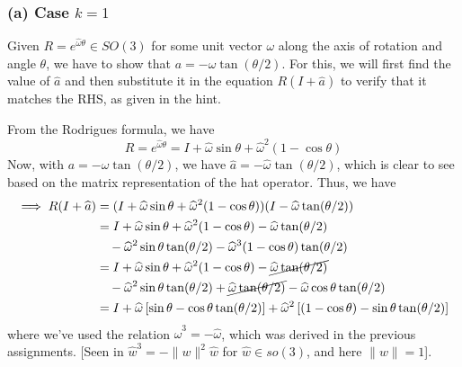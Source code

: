 \clearpage
\subsubsection*{(a) Case \( k=1 \)}

Given \( R = e^{\widehat{\omega} \theta} \in SO(3) \) for some unit vector \( \omega \) along the axis of rotation and angle \( \theta \), we have to show that \( a = -\omega \tan(\theta / 2) \).
For this, we will first find the value of \( \widehat{a} \) and then substitute it in the equation \( R(I + \widehat{a}) \) to verify that it matches the RHS, as given in the hint.

From the Rodrigues formula, we have
\begin{equation*}
    R = e^{\widehat{\omega} \theta} = I + \widehat{\omega} \sin \theta + \widehat{\omega}^{2} (1 - \cos \theta)
\end{equation*}
Now, with \( a = -\omega \tan(\theta / 2) \), we have \( \widehat{a} = -\widehat{\omega} \tan(\theta / 2) \), which is clear to see based on the matrix representation of the hat operator.
Thus, we have
\begin{align*}
    \implies
    R(I + \widehat{a})
     & =
    (I + \widehat{\omega} \sin \theta + \widehat{\omega}^{2} (1 - \cos \theta))(I - \widehat{\omega} \tan(\theta / 2))
    \\ & =
    I + \widehat{\omega} \sin \theta + \widehat{\omega}^{2} (1 - \cos \theta) - \widehat{\omega} \tan(\theta / 2)
    \\ & \quad
    - \widehat{\omega}^{2} \sin \theta \tan(\theta / 2) - \widehat{\omega}^{3} (1 - \cos \theta) \tan(\theta / 2)
    \\ & =
    I + \widehat{\omega} \sin \theta + \widehat{\omega}^{2} (1 - \cos \theta) - \cancel{\widehat{\omega} \tan(\theta / 2)}
    \\ & \quad
    - \widehat{\omega}^{2} \sin \theta \tan(\theta / 2) + \cancel{\widehat{\omega} \tan(\theta / 2)} - \widehat{\omega} \cos \theta \tan(\theta / 2)
    \\ & =
    I + \widehat{\omega} \left[ \sin \theta - \cos \theta \tan(\theta / 2) \right] + \widehat{\omega}^{2} \left[(1 - \cos \theta) - \sin \theta \tan(\theta / 2) \right]
\end{align*}
where we've used the relation \( \widehat{\omega}^{3} = -\widehat{\omega} \), which was derived in the previous assignments.
[Seen in \( \hat{w}^{3}=-\|w\|^{2} \hat{w} \) for \( \hat{w} \in so(3) \), and here \( \|w\|=1 \)].

